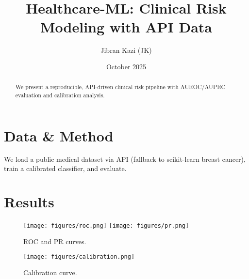 \documentclass[10pt]{article}
\title{Healthcare-ML: Clinical Risk Modeling with API Data}
\author{Jibran Kazi (JK)}
\date{October 2025}
\begin{document}
\maketitle
\begin{abstract}
We present a reproducible, API-driven clinical risk pipeline with AUROC/AUPRC evaluation and calibration analysis.
\end{abstract}
\section{Data \& Method}
We load a public medical dataset via API (fallback to scikit-learn breast cancer), train a calibrated classifier, and evaluate.
\section{Results}

\begin{figure}[h]
\centering
\texttt{[image: figures/roc.png]}
\texttt{[image: figures/pr.png]}
\caption{ROC and PR curves.}
\end{figure}
\begin{figure}[h]
\centering
\texttt{[image: figures/calibration.png]}
\caption{Calibration curve.}
\end{figure}
\end{document}
